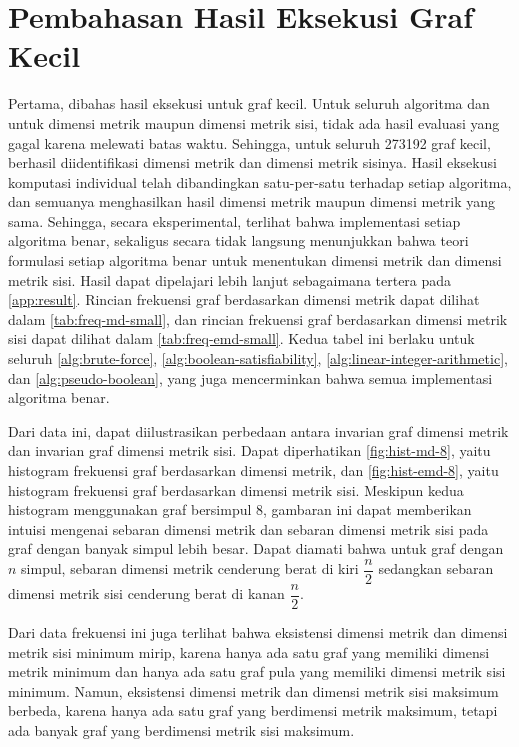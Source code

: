 \section{Pembahasan Hasil Eksekusi Graf Kecil}
\label{sec:discussion-small}

Pertama, dibahas hasil eksekusi untuk graf kecil. Untuk seluruh algoritma dan untuk dimensi metrik maupun dimensi metrik sisi, tidak ada hasil evaluasi yang gagal karena melewati batas waktu. Sehingga, untuk seluruh 273192 graf kecil, berhasil diidentifikasi dimensi metrik dan dimensi metrik sisinya. Hasil eksekusi komputasi individual telah dibandingkan satu-per-satu terhadap setiap algoritma, dan semuanya menghasilkan hasil dimensi metrik maupun dimensi metrik yang sama. Sehingga, secara eksperimental, terlihat bahwa implementasi setiap algoritma benar, sekaligus secara tidak langsung menunjukkan bahwa teori formulasi setiap algoritma benar untuk menentukan dimensi metrik dan dimensi metrik sisi. Hasil dapat dipelajari lebih lanjut sebagaimana tertera pada \cref{app:result}. Rincian frekuensi graf berdasarkan dimensi metrik dapat dilihat dalam \autoref{tab:freq-md-small}, dan rincian frekuensi graf berdasarkan dimensi metrik sisi dapat dilihat dalam \autoref{tab:freq-emd-small}. Kedua tabel ini berlaku untuk seluruh \autoref{alg:brute-force}, \autoref{alg:boolean-satisfiability}, \autoref{alg:linear-integer-arithmetic}, dan \autoref{alg:pseudo-boolean}, yang juga mencerminkan bahwa semua implementasi algoritma benar.

Dari data ini, dapat diilustrasikan perbedaan antara invarian graf dimensi metrik dan invarian graf dimensi metrik sisi. Dapat diperhatikan \autoref{fig:hist-md-8}, yaitu histogram frekuensi graf berdasarkan dimensi metrik, dan \autoref{fig:hist-emd-8}, yaitu histogram frekuensi graf berdasarkan dimensi metrik sisi. Meskipun kedua histogram menggunakan graf bersimpul 8, gambaran ini dapat memberikan intuisi mengenai sebaran dimensi metrik dan sebaran dimensi metrik sisi pada graf dengan banyak simpul lebih besar. Dapat diamati bahwa untuk graf dengan \(n\) simpul, sebaran dimensi metrik cenderung berat di kiri \(\dfrac{n}{2}\) sedangkan sebaran dimensi metrik sisi cenderung berat di kanan \(\dfrac{n}{2}\).

Dari data frekuensi ini juga terlihat bahwa eksistensi dimensi metrik dan dimensi metrik sisi minimum mirip, karena hanya ada satu graf yang memiliki dimensi metrik minimum dan hanya ada satu graf pula yang memiliki dimensi metrik sisi minimum. Namun, eksistensi dimensi metrik dan dimensi metrik sisi maksimum berbeda, karena hanya ada satu graf yang berdimensi metrik maksimum, tetapi ada banyak graf yang berdimensi metrik sisi maksimum.

